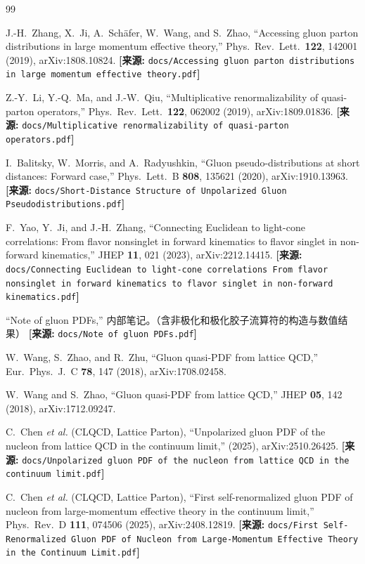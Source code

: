 \documentclass[12pt,a4paper]{ctexart}
\theoremstyle{definition}
\begin{document}
\begin{thebibliography}{99}

J.-H.~Zhang, X.~Ji, A.~Sch\"afer, W.~Wang, and S.~Zhao,
``Accessing gluon parton distributions in large momentum effective theory,''
Phys.\ Rev.\ Lett.\ \textbf{122}, 142001 (2019), arXiv:1808.10824.
\quad\textbf{[来源:} \texttt{docs/Accessing gluon parton distributions in large momentum effective theory.pdf}\textbf{]}

Z.-Y.~Li, Y.-Q.~Ma, and J.-W.~Qiu,
``Multiplicative renormalizability of quasi-parton operators,''
Phys.\ Rev.\ Lett.\ \textbf{122}, 062002 (2019), arXiv:1809.01836.
\quad\textbf{[来源:} \texttt{docs/Multiplicative renormalizability of quasi-parton operators.pdf}\textbf{]}

I.~Balitsky, W.~Morris, and A.~Radyushkin,
``Gluon pseudo-distributions at short distances: Forward case,''
Phys.\ Lett.\ B \textbf{808}, 135621 (2020), arXiv:1910.13963.
\quad\textbf{[来源:} \texttt{docs/Short-Distance Structure of Unpolarized Gluon Pseudodistributions.pdf}\textbf{]}

F.~Yao, Y.~Ji, and J.-H.~Zhang,
``Connecting Euclidean to light-cone correlations: From flavor nonsinglet in forward kinematics to flavor singlet in non-forward kinematics,''
JHEP \textbf{11}, 021 (2023), arXiv:2212.14415.
\quad\textbf{[来源:} \texttt{docs/Connecting Euclidean to light-cone correlations From flavor nonsinglet in forward kinematics to flavor singlet in non-forward kinematics.pdf}\textbf{]}

``Note of gluon PDFs,''
内部笔记。（含非极化和极化胶子流算符的构造与数值结果）
\quad\textbf{[来源:} \texttt{docs/Note of gluon PDFs.pdf}\textbf{]}

W.~Wang, S.~Zhao, and R.~Zhu,
``Gluon quasi-PDF from lattice QCD,''
Eur.\ Phys.\ J.\ C \textbf{78}, 147 (2018), arXiv:1708.02458.

W.~Wang and S.~Zhao,
``Gluon quasi-PDF from lattice QCD,''
JHEP \textbf{05}, 142 (2018), arXiv:1712.09247.

C.~Chen \textit{et al.} (CLQCD, Lattice Parton),
``Unpolarized gluon PDF of the nucleon from lattice QCD in the continuum limit,''
(2025), arXiv:2510.26425.
\quad\textbf{[来源:} \texttt{docs/Unpolarized gluon PDF of the nucleon from lattice QCD in the continuum limit.pdf}\textbf{]}

C.~Chen \textit{et al.} (CLQCD, Lattice Parton),
``First self-renormalized gluon PDF of nucleon from large-momentum effective theory in the continuum limit,''
Phys.\ Rev.\ D \textbf{111}, 074506 (2025), arXiv:2408.12819.
\quad\textbf{[来源:} \texttt{docs/First Self-Renormalized Gluon PDF of Nucleon from Large-Momentum Effective Theory in the Continuum Limit.pdf}\textbf{]}


\end{thebibliography}
\end{document}
